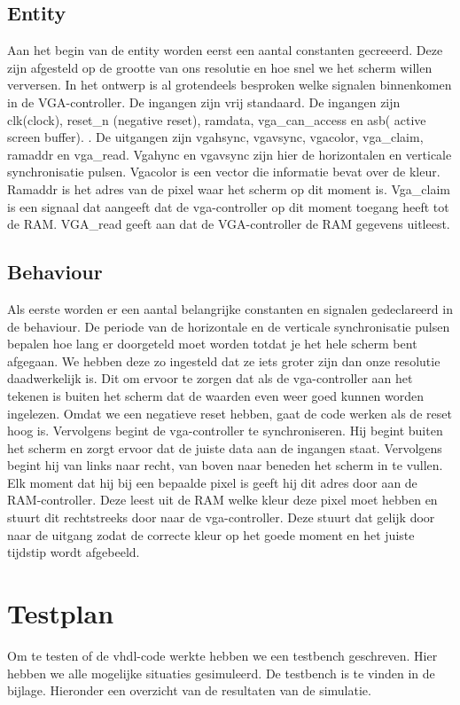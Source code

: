 \documentclass{scrartcl} %
\begin{document}
\subsection{Entity}
Aan het begin van de entity worden eerst een aantal constanten gecreeerd. Deze zijn afgesteld op de grootte van ons resolutie en hoe snel we het scherm willen verversen. In het ontwerp is al grotendeels besproken welke signalen binnenkomen in de VGA-controller. De ingangen zijn vrij standaard. De ingangen zijn clk(clock), reset\_n (negative reset), ramdata, vga\_can\_access en asb( active screen buffer). . De uitgangen zijn vgahsync, vgavsync, vgacolor, vga\_claim, ramaddr en vga\_read. Vgahync en vgavsync zijn hier de horizontalen en verticale synchronisatie pulsen. Vgacolor is een vector die informatie bevat over de kleur. Ramaddr is het adres van de pixel waar het scherm op dit moment is. Vga\_claim is een signaal dat aangeeft dat de vga-controller op dit moment toegang heeft tot de RAM. VGA\_read geeft aan dat de VGA-controller de RAM gegevens uitleest.

\subsection{Behaviour}
Als eerste worden er een aantal belangrijke constanten en signalen gedeclareerd in de behaviour. De periode van de horizontale en de verticale synchronisatie pulsen bepalen hoe lang er doorgeteld moet worden totdat je het hele scherm bent afgegaan. We hebben deze zo ingesteld dat ze iets groter zijn dan onze resolutie daadwerkelijk is. Dit om ervoor te zorgen dat als de vga-controller aan het tekenen is buiten het scherm dat de waarden even weer goed kunnen worden ingelezen. Omdat we een negatieve reset hebben, gaat de code werken als de reset hoog is. Vervolgens begint de vga-controller te synchroniseren. Hij begint buiten het scherm en zorgt ervoor dat de juiste data aan de ingangen staat. Vervolgens begint hij van links naar recht, van boven naar beneden het scherm in te vullen. Elk moment dat hij bij een bepaalde pixel is geeft hij dit adres door aan de RAM-controller. Deze leest uit de RAM welke kleur deze pixel moet hebben en stuurt dit rechtstreeks door naar de vga-controller. Deze stuurt dat gelijk door naar de uitgang zodat de correcte kleur op het goede moment en het juiste tijdstip wordt afgebeeld. 


\section{Testplan}
Om te testen of de vhdl-code werkte hebben we een testbench geschreven. Hier hebben we alle mogelijke situaties gesimuleerd. De testbench is te vinden in de bijlage. Hieronder een overzicht van de resultaten van de simulatie.
\end{document}
